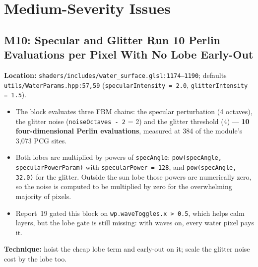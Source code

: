 \documentclass[11pt,a4paper]{article}
\begin{document}
\section{Medium-Severity Issues}

\subsection{M10: Specular and Glitter Run 10 Perlin Evaluations per Pixel With No Lobe Early-Out}

\textbf{Location:} \texttt{shaders/includes/water\_surface.glsl:1174--1190}; defaults
\texttt{utils/WaterParams.hpp:57,59} (\texttt{specularIntensity = 2.0}, \texttt{glitterIntensity = 1.5}).

\begin{itemize}
    \item The block evaluates three FBM chains: the specular perturbation (4 octaves), the glitter noise
    (\texttt{noiseOctaves - 2} = 2) and the glitter threshold (4) --- \textbf{10 four-dimensional Perlin evaluations},
    measured at 384 of the module's 3,073 PCG sites.
    \item Both lobes are multiplied by powers of \texttt{specAngle}: \texttt{pow(specAngle, specularPowerParam)} with
    \texttt{specularPower = 128}, and \texttt{pow(specAngle, 32.0)} for the glitter. Outside the sun lobe those powers
    are numerically zero, so the noise is computed to be multiplied by zero for the overwhelming majority of pixels.
    \item Report~19 gated this block on \texttt{wp.waveToggles.x > 0.5}, which helps calm layers, but the lobe gate is
    still missing: with waves on, every water pixel pays it.
\end{itemize}

\textbf{Technique:} hoist the cheap lobe term and early-out on it; scale the glitter noise cost by the lobe too.
\end{document}
